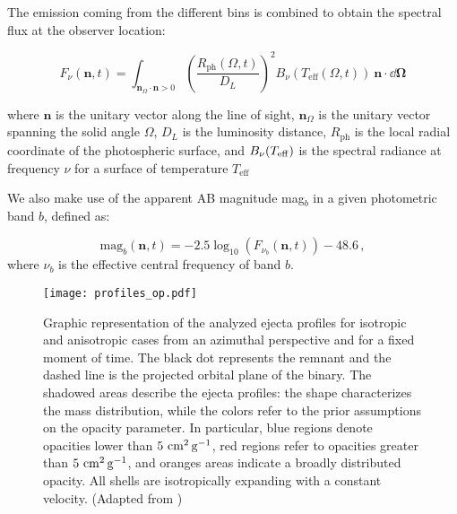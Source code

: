 The emission coming from the different bins is combined to obtain the spectral flux at the observer location:

\begin{equation}
\label{eq:spectral_flux}
F_{\nu}(\mathbf{n},t) = \int_{\mathbf{n}_{\Omega} \cdot \mathbf{n}> 0} \left( \frac{R_{\text{ph}}(\Omega,t)}{D_L} \right)^2  B_{\nu}(T_{\text{eff}}(\Omega,t))~\mathbf{n} \cdot  \dd\boldsymbol{\Omega} 
\end{equation}

where $\mathbf{n}$ is the unitary vector along the line of sight, $\mathbf{n}_{\Omega}$ is the unitary vector spanning the solid angle $\Omega$, $D_L$ is the luminosity distance, $R_{\text{ph}}$ is the local radial coordinate of the photospheric surface, and $B_{\nu}(T_{\rm eff})$ is the spectral radiance at frequency $\nu$ for a surface of temperature $T_{\text{eff}}$

We also make use of the apparent AB magnitude mag$_b$ in a given photometric band $b$, defined as:

\begin{equation}
\label{eq:mag}
\text{mag}_b(\mathbf{n},t) = -2.5 \log_{10}\left( F_{\nu_b}(\mathbf{n},t) \right)-48.6\,,
\end{equation}
where $\nu_b$ is the effective central frequency of band $b$.



\begin{figure}
    \centering 
    \texttt{[image: profiles\_op.pdf]}
    \caption{Graphic representation of the analyzed
        ejecta profiles for isotropic and anisotropic cases
        from an azimuthal perspective and for a fixed moment of time.
        The black dot represents the remnant and the dashed line is the projected orbital
        plane of the binary. The shadowed areas describe the ejecta profiles: the shape
        characterizes the mass distribution, while the colors refer to 
        the prior assumptions on the opacity parameter.
        In particular, blue regions denote opacities lower than $5~{\rm cm^{2}\,g^{-1}}$,
        red regions refer to opacities greater than $5~{\rm cm^{2}\,g^{-1}}$,
        and oranges areas indicate a broadly distributed opacity.
        All shells are isotropically expanding with a constant velocity.
        (Adapted from \citet{Breschi:2021wzr})
    }
    \label{fig:cartoon}
\end{figure}



